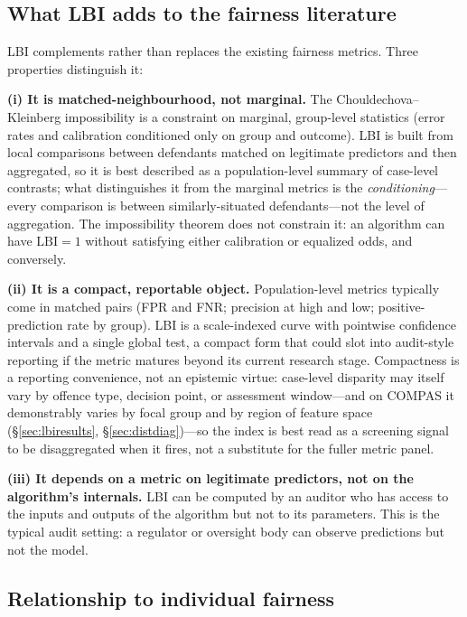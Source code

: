 \documentclass[11pt]{article}
\begin{document}
\subsection{What LBI adds to the fairness literature}

LBI complements rather than replaces the existing fairness metrics.
Three properties distinguish it:

\textbf{(i) It is matched-neighbourhood, not marginal.} The
Chouldechova--Kleinberg impossibility is a constraint on marginal,
group-level statistics (error rates and calibration conditioned only
on group and outcome). LBI is built from local comparisons between
defendants matched on legitimate predictors and then aggregated, so
it is best described as a population-level summary of case-level
contrasts; what distinguishes it from the marginal metrics is the
\emph{conditioning}---every comparison is between similarly-situated
defendants---not the level of aggregation. The impossibility theorem
does not constrain it: an algorithm can have $\mathrm{LBI} = 1$
without satisfying either calibration or equalized odds, and
conversely.

\textbf{(ii) It is a compact, reportable object.} Population-level
metrics typically come in matched pairs (FPR and FNR; precision at
high and low; positive-prediction rate by group). LBI is a
scale-indexed curve with pointwise confidence intervals and a single
global test, a compact form that could slot into audit-style
reporting if the metric matures beyond its current research stage.
Compactness is a reporting convenience, not an epistemic virtue:
case-level disparity may itself vary by offence type, decision point,
or assessment window---and on COMPAS it demonstrably varies by focal
group and by region of feature space (\S\ref{sec:lbiresults},
\S\ref{sec:distdiag})---so the index is best read as a screening
signal to be disaggregated when it fires, not a substitute for the
fuller metric panel.

\textbf{(iii) It depends on a metric on legitimate predictors, not
on the algorithm's internals.} LBI can be computed by an auditor
who has access to the inputs and outputs of the algorithm but not
to its parameters. This is the typical audit setting: a regulator
or oversight body can observe predictions but not the model.

\subsection{Relationship to individual fairness}
\label{sec:individualfairness}
\end{document}

